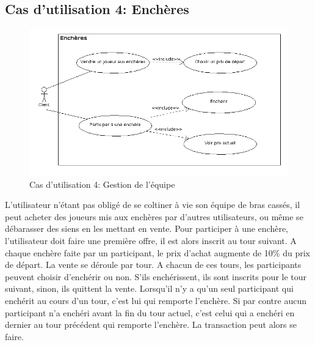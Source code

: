 \documentclass[a4paper,titlepage]{scrreprt}
\begin{document}
  \subsection{Cas d'utilisation 4: Enchères}
  \begin{figure}[H]
    \center
    \includegraphics[scale=0.5]{uml/useCaseView/Encheres.png}
    \caption{Cas d'utilisation 4: Gestion de l'équipe}
  \end{figure}  
    L'utilisateur n'étant pas obligé de se coltiner à vie son équipe de bras cassés, il peut acheter des joueurs mis aux enchères par d'autres utilisateurs, ou même se débarasser des siens en les mettant en vente. Pour participer à une enchère, l'utilisateur doit faire une première offre, il est alors inscrit au tour suivant. A chaque enchère faite par un participant, le prix d'achat augmente de 10\% du prix de départ. La vente se déroule par tour. A chacun de ces tours, les participants peuvent choisir d'enchérir ou non. S'ils enchérissent, ils sont inscrits pour le tour suivant, sinon, ils quittent la vente. Lorsqu'il n'y a qu'un seul participant qui enchérit au cours d'un tour, c'est lui qui remporte l'enchère. Si par contre aucun participant n'a enchéri avant la fin du tour actuel, c'est celui qui a enchéri en dernier au tour précédent qui remporte l'enchère. La transaction peut alors se faire. 
\end{document}
